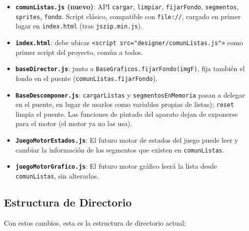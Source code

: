   \begin{itemize}
  	\item \textbf{\texttt{comunListas.js} (nuevo)}: API \texttt{cargar}, \texttt{limpiar},
  	\texttt{fijarFondo}, \texttt{segmentos}, \texttt{sprites}, \texttt{fondo}. Script
  	clásico, compatible con \texttt{file://}, cargado en primer lugar en
  	\texttt{index.html} (tras \texttt{jszip.min.js}).
  	 	
  	\item \textbf{\texttt{index.html}}: debe ubicar \texttt{<script src="designer/comunListas.js">} como primer script del proyecto, común a todos.

  	\item \textbf{\texttt{baseDirector.js}}: junto a
	\texttt{BaseGraficos.fijarFondo(imgF)}, fija también el fondo en el puente
	(\texttt{comunListas.fijarFondo}).

  	\item \textbf{\texttt{BaseDescomponer.js}}: \texttt{cargarListas} y
  	\texttt{segmentosEnMemoria} pasan a delegar en el puente, en lugar de usarlos como variables
  	propias de listas); \texttt{reset} limpia el puente. Las funciones de pintado del
  	aparato dejan de exponerse para el motor (el motor ya no las usa).
  	
 	\item \textbf{\texttt{JuegoMotorEstados.js}}: El futuro motor de estados del juego 
 	 puede leer y cambiar la información de los segmentos que existen en \texttt{comunListas}. 
  	
  	\item \textbf{\texttt{juegoMotorGrafico.js}}: El futuro motor gráfico leerá la lista desde \texttt{comunListas}, sin alterarlas. 
  	
  \end{itemize}
  
  \clearpage
  
  \subsection{Estructura de Directorio}
  \label{subsec:EstructuraDirectorioF2I1}
   Con estos cambios, esta es la estructura de directorio actual:
  
 
 
